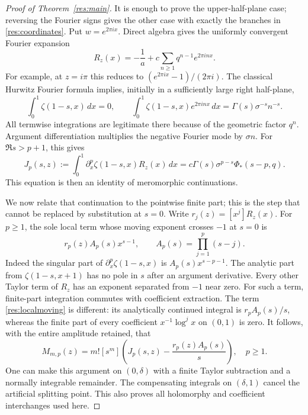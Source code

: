\documentclass[11pt,a4paper]{article}
\numberwithin{equation}{section}
\theoremstyle{definition}
\theoremstyle{remark}
\begin{document}
\begin{proof}[Proof of Theorem~\ref{res:main}]
It is enough to prove the upper-half-plane case; reversing the
Fourier signs gives the other case with exactly the branches in
\eqref{res:coordinates}. Put $w=e^{2\pi ix}$. Direct algebra gives
the uniformly convergent Fourier expansion
\begin{equation}\label{res:fourierkernel}
 R_z(x)=-\frac1a+c\sum_{n\ge1}q^{n-1}e^{2\pi inx}.
\end{equation}
For example, at $z=i\pi$ this reduces to
$(e^{2\pi ix}-1)/(2\pi i)$. The classical Hurwitz Fourier formula
\cite[\S25.11]{DLMF} implies, initially in a sufficiently large
right half-plane,
\[
 \int_0^1\zeta(1-s,x)\,dx=0,\qquad
 \int_0^1\zeta(1-s,x)e^{2\pi inx}\,dx
       =\Gamma(s)\sigma^{-s}n^{-s}.
\]
All termwise integrations are legitimate there because of the
geometric factor $q^n$. Argument differentiation multiplies the
negative Fourier mode by $\sigma n$. For $\Re s>p+1$, this gives
\begin{equation}\label{res:spectralintegral}
 J_p(s,z):=\int_0^1\partial_x^p\zeta(1-s,x)R_z(x)\,dx
       =c\Gamma(s)\sigma^{p-s}\Phi_*(s-p,q).
\end{equation}
This equation is then an identity of meromorphic continuations.

We now relate that continuation to the pointwise finite part;
this is the step that cannot be replaced by substitution at $s=0$.
Write $r_j(z)=[x^j]R_z(x)$. For $p\ge1$, the sole local term
whose moving exponent crosses $-1$ at $s=0$ is
\begin{equation}\label{res:localmoving}
 r_p(z)A_p(s)x^{s-1},\qquad
 A_p(s)=\prod_{j=1}^p(s-j).
\end{equation}
Indeed the singular part of
$\partial_x^p\zeta(1-s,x)$ is
$A_p(s)x^{s-p-1}$. The analytic part from $\zeta(1-s,x+1)$
has no pole in $s$ after an argument derivative. Every other
Taylor term of $R_z$ has an exponent separated from $-1$ near
zero. For such a term, finite-part integration commutes with
coefficient extraction. The term \eqref{res:localmoving} is different:
its analytically continued integral is $r_pA_p(s)/s$, whereas the
finite part of every coefficient $x^{-1}\log^j x$ on $(0,1)$ is zero.
It follows, with the entire amplitude retained, that
\begin{equation}\label{res:completion}
 M_{m,p}(z)=m![s^m]
            \left(J_p(s,z)-\frac{r_p(z)A_p(s)}s\right),\quad p\ge1.
\end{equation}
One can make this argument on $(0,\delta)$ with a finite Taylor
subtraction and a normally integrable remainder. The compensating
integrals on $(\delta,1)$ cancel the artificial splitting point.
This also proves all holomorphy and coefficient interchanges used here.


\end{proof}
\end{document}
